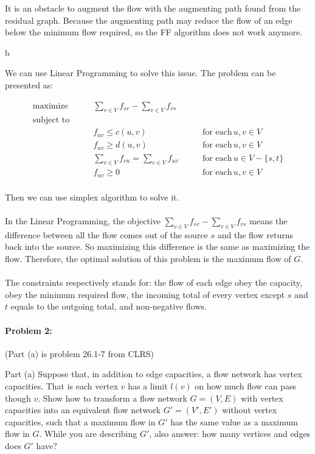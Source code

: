 \documentclass{article}
\begin{document}
It is an obstacle to augment the flow with the augmenting path found from the residual graph. Because the augmenting path may reduce the flow of an edge below the minimum flow required, so the FF algorithm does not work anymore.

b

We can use Linear Programming to solve this issue.
The problem can be presented as:


$$\begin{aligned}
\text{maximize}\qquad&\sum_{v \in V}f_{sv} - \sum_{v \in V}f_{vs}\\
\text{subject to}\qquad&\\
&f_{uv} \le c(u, v) \qquad &\text{for each}\, u,v \in V\\
&f_{uv} \ge d(u, v) \qquad &\text{for each}\, u,v \in V\\
&\sum_{v \in V}f_{vu} = \sum_{v \in V}f_{uv} \qquad &\text{for each}\, u \in V - \{s, t\}\\
&f_{uv} \ge 0 \qquad &\text{for each}\, u,v \in V\\
\end{aligned}$$

Then we can use simplex algorithm to solve it.

\paragraph{}
In the Linear Programming, the objective $\sum_{v \in V}f_{sv} - \sum_{v \in V}f_{vs}$ means the difference between all the flow comes out of the source $s$ and the flow returns back into the source. So maximizing this difference is the same as maximizing the flow. Therefore, the optimal solution of this problem is the maximum flow of $G$.

\paragraph{}
The constraints respectively stands for: the flow of each edge obey the capacity, obey the minimum required flow, the incoming total of every vertex except $s$ and $t$ equals to the outgoing total, and non-negative flows.

\newpage
\paragraph{Problem 2:} (Part (a) is problem 26.1-7 from CLRS)

Part (a) Suppose that, in addition to edge capacities, a flow network has vertex capacities.
That is each vertex $v$ has a limit $l(v)$ on how much flow can pass though $v$. Show
how to transform a flow network $G=(V,E)$ with vertex capacities into an equivalent
flow network $G'=(V',E')$ without vertex capacities, such that a maximum flow in $G'$ has the same value as a maximum flow in $G$. While you are describing $G'$, also answer: how many vertices and edges does $G'$ have?
\end{document}
